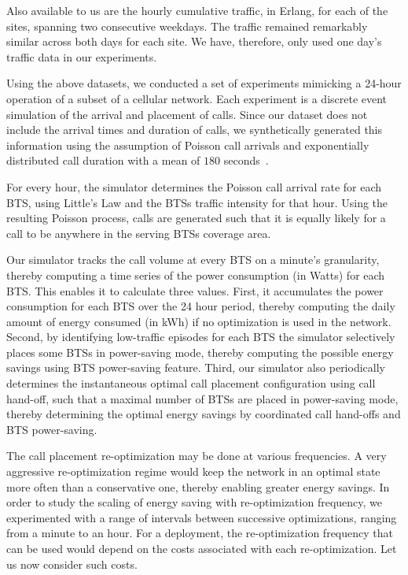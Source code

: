 Also available to us are the hourly cumulative traffic, in Erlang, for each of the sites, spanning two consecutive weekdays. The traffic remained remarkably similar across both days for each site. We have, therefore, only used one day's traffic data in our experiments.

Using the above datasets, we conducted a set of experiments mimicking a 24-hour operation of a subset of a cellular network. Each experiment is a discrete event simulation of the arrival and placement of calls. Since our dataset does not include the arrival times and duration of calls, we synthetically generated this information using the assumption of Poisson call arrivals and exponentially distributed call duration with a mean of $180$ seconds~\cite{Gerla:1995:MMM:276418.276421}.

For every hour, the simulator determines the Poisson call arrival rate for each BTS, using Little's Law and the BTSs traffic intensity for that hour. Using the resulting Poisson process, calls are generated such that it is equally likely for a call to be anywhere in the serving BTSs coverage area.

Our simulator tracks the call volume at every BTS on a minute's granularity, thereby computing a time series of the power consumption (in Watts) for each BTS. This enables it to calculate three values. First, it accumulates the power consumption for each BTS over the 24 hour period, thereby computing the daily amount of energy consumed (in kWh) if no optimization is used in the network. Second, by identifying low-traffic episodes for each BTS the simulator selectively places some BTSs in power-saving mode, thereby computing the possible energy savings using BTS power-saving feature. Third, our simulator also periodically determines the instantaneous optimal call placement configuration using call hand-off, such that a maximal number of BTSs are placed in power-saving mode, thereby determining the optimal energy savings by coordinated call hand-offs and BTS power-saving.

The call placement re-optimization may be done at various frequencies. A very aggressive re-optimization regime would keep the network in an optimal state more often than a conservative one, thereby enabling greater energy savings. In order to study the scaling of energy saving with re-optimization frequency, we experimented with a range of intervals between successive optimizations, ranging from a minute to an hour. For a deployment, the re-optimization frequency that can be used would depend on the costs associated with each re-optimization. Let us now consider such costs.

